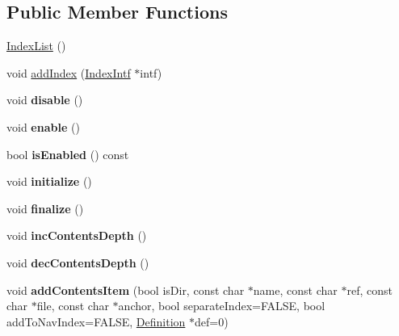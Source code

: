 \subsection*{Public Member Functions}
\begin{DoxyCompactItemize}
\item 
\mbox{\hyperlink{class_index_list_a9d525f0a264b6aba4f8acf2d513a31ea}{Index\+List}} ()
\item 
void \mbox{\hyperlink{class_index_list_a8120913e328f96fec6e5b2070902f4e7}{add\+Index}} (\mbox{\hyperlink{class_index_intf}{Index\+Intf}} $\ast$intf)
\item 
\mbox{\label{class_index_list_ae7334e24bfdf93caf3db9d61ae62caf6}} 
void {\bfseries disable} ()
\item 
\mbox{\label{class_index_list_aabffffbc2e50eeb9437640c369dfd6b7}} 
void {\bfseries enable} ()
\item 
\mbox{\label{class_index_list_ab255d94f91cba673bf82de1edc3737ec}} 
bool {\bfseries is\+Enabled} () const
\item 
\mbox{\label{class_index_list_a104b016afa73759d65b08f6c1cced210}} 
void {\bfseries initialize} ()
\item 
\mbox{\label{class_index_list_af04e11231983acb4dbf381e809bfa178}} 
void {\bfseries finalize} ()
\item 
\mbox{\label{class_index_list_ac6af95293030206c0224260e9b1d7aca}} 
void {\bfseries inc\+Contents\+Depth} ()
\item 
\mbox{\label{class_index_list_a4bad65cd2fadab4529bbfe5df78cc019}} 
void {\bfseries dec\+Contents\+Depth} ()
\item 
\mbox{\label{class_index_list_afac63d024f410eaf10960f240e881f0b}} 
void {\bfseries add\+Contents\+Item} (bool is\+Dir, const char $\ast$name, const char $\ast$ref, const char $\ast$file, const char $\ast$anchor, bool separate\+Index=F\+A\+L\+SE, bool add\+To\+Nav\+Index=F\+A\+L\+SE, \mbox{\hyperlink{class_definition}{Definition}} $\ast$def=0)
\item 
\mbox{\label{class_index_list_aab8f1fb60ccd7074dfcacab6584ebaa2}} 

\end{DoxyCompactItemize}

